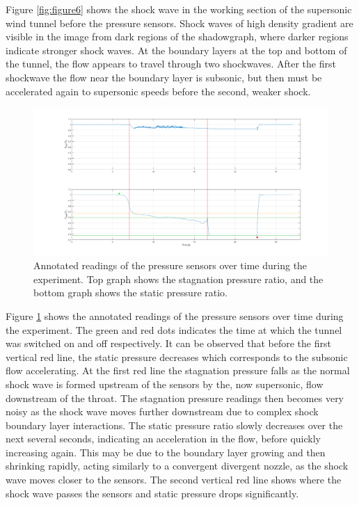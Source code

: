 \documentclass[8pt]{article}
\begin{document}
Figure \ref{fig:figure6} shows the shock wave in the working section of the supersonic wind tunnel before the pressure sensors.
Shock waves of high density gradient are visible in the image from dark regions of the shadowgraph, where darker regions indicate stronger shock waves.
At the boundary layers at the top and bottom of the tunnel, the flow appears to travel through two shockwaves.
After the first shockwave the flow near the boundary layer is subsonic, but then must be accelerated again to supersonic speeds before the second, weaker shock.


\begin{figure}[H]
    \centering
    \includegraphics[width=1\textwidth]{tunnel_pressures_annotated.png}
    \caption{Annotated readings of the pressure sensors over time during the experiment. Top graph shows the stagnation pressure ratio, and the bottom graph shows the static pressure ratio.}
    \label{fig:figure8}
\end{figure}

Figure \ref{fig:figure8} shows the annotated readings of the pressure sensors over time during the experiment.
The green and red dots indicates the time at which the tunnel was switched on and off respectively.
It can be observed that before the first vertical red line, the static pressure decreases which corresponds to the subsonic flow accelerating.
At the first red line the stagnation pressure falls as the normal shock wave is formed upstream of the sensors by the, now supersonic, flow downstream of the throat.
The stagnation pressure readings then becomes very noisy as the shock wave moves further downstream due to complex shock boundary layer interactions.
The static pressure ratio slowly decreases over the next several seconds, indicating an acceleration in the flow, before quickly increasing again.
This may be due to the boundary layer growing and then shrinking rapidly, acting similarly to a convergent divergent nozzle, as the shock wave moves closer to the sensors.
The second vertical red line shows where the shock wave passes the sensors and static pressure drops significantly.
\end{document}
